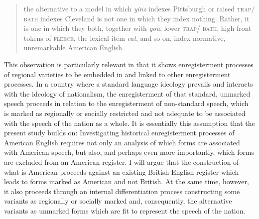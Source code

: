\begin{quote}
the alternative to a model in which \emph{yinz} indexes Pittsburgh or raised \textsc{trap}/ \textsc{bath} indexes Cleveland is not one in which they index nothing. Rather, it is one in which they both, together with \emph{you}, lower \textsc{trap}/ \textsc{bath}, high front tokens of \textsc{fleece}, the lexical item \emph{cat}, and so on, index normative, unremarkable American English. \citep[98]{CampbellKibler2015}
\end{quote}

This observation is particularly relevant in that it shows enregisterment processes of regional varieties to be embedded in and linked to other enregisterment processes. In a country where a standard language ideology prevails and interacts with the ideology of nationalism, the enregisterment of that standard, unmarked speech proceeds in relation to the enregisterment of non-standard speech, which is marked as regionally or socially restricted and not adequate to be associated with the speech of the nation as a whole. It is essentially this assumption that the present study builds on: Investigating historical enregisterment processes of American English requires not only an analysis of which forms are associated with American speech, but also, and perhaps even more importantly, which forms are excluded from an American register. I will argue that the construction of what is American proceeds against an existing British English register which leads to forms marked as American and not British. At the same time, however, it also proceeds through an internal differentiation process constructing some variants as regionally or socially marked and, consequently, the alternative variants as unmarked forms which are fit to represent the speech of the nation.

